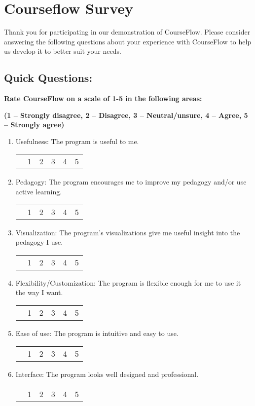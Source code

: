 \documentclass{article}
\begin{document}
\section*{Courseflow Survey}

\vspace{0.5cm}

Thank you for participating in our demonstration of CourseFlow. Please consider answering the following questions about your experience with CourseFlow to help us develop it to better suit your needs.

\subsection*{Quick Questions:}

\textbf{Rate CourseFlow on a scale of 1-5 in the following areas:}

{\small \textbf{(1 -- Strongly disagree, 2 -- Disagree, 3 -- Neutral/unsure, 4 -- Agree, 5 -- Strongly agree)}}

\begin{enumerate}
\item Usefulness: The program is useful to me.

\begin{tabularx}{0.5\textwidth}{XXXXXX}
&1&2&3&4&5
\end{tabularx}
\item Pedagogy: The program encourages me to improve my pedagogy and/or use active learning.

\begin{tabularx}{0.5\textwidth}{XXXXXX}
&1&2&3&4&5
\end{tabularx}
\item Visualization: The program's visualizations give me useful insight into the pedagogy I use.

\begin{tabularx}{0.5\textwidth}{XXXXXX}
&1&2&3&4&5
\end{tabularx}
\item Flexibility/Customization: The program is flexible enough for me to use it the way I want.

\begin{tabularx}{0.5\textwidth}{XXXXXX}
&1&2&3&4&5
\end{tabularx}
\item Ease of use: The program is intuitive and easy to use.

\begin{tabularx}{0.5\textwidth}{XXXXXX}
&1&2&3&4&5
\end{tabularx}

\item Interface: The program looks well designed and professional.

\begin{tabularx}{0.5\textwidth}{XXXXXX}
&1&2&3&4&5
\end{tabularx}

\end{enumerate}
\end{document}
